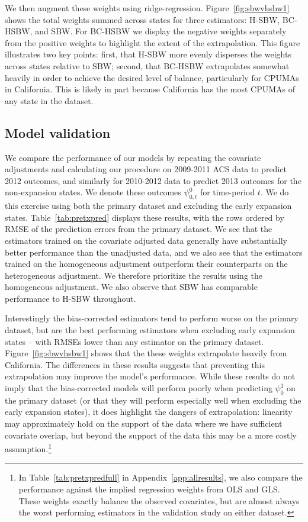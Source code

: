 \documentclass[aoas]{imsart}
\theoremstyle{plain}
\theoremstyle{remark}
\begin{document}
We then augment these weights using ridge-regression. Figure~\ref{fig:sbwvhsbw1} shows the total weights summed across states for three estimators: H-SBW, BC-HSBW, and SBW. For BC-HSBW we display the negative weights separately from the positive weights to highlight the extent of the extrapolation. This figure illustrates two key points: first, that H-SBW more evenly disperses the weights across states relative to SBW; second, that BC-HSBW extrapolates somewhat heavily in order to achieve the desired level of balance, particularly for CPUMAs in California. This is likely in part because California has the most CPUMAs of any state in the dataset.

\subsection{Model validation}\label{sec:validation}

We compare the performance of our models by repeating the covariate adjustments and calculating our procedure on 2009-2011 ACS data to predict 2012 outcomes, and similarly for 2010-2012 data to predict 2013 outcomes for the non-expansion states. We denote these outcomes $\psi^0_{0, t}$ for time-period $t$. We do this exercise using both the primary dataset and excluding the early expansion states. Table~\ref{tab:pretxpred} displays these results, with the rows ordered by RMSE of the prediction errors from the primary dataset. We see that the estimators trained on the covariate adjusted data generally have substantially better performance than the unadjusted data, and we also see that the estimators trained on the homogeneous adjustment outperform their counterparts on the heterogeneous adjustment. We therefore prioritize the results using the homogeneous adjustment. We also observe that SBW has comparable performance to H-SBW throughout.

Interestingly the bias-corrected estimators tend to perform worse on the primary dataset, but are the best performing estimators when excluding early expansion states -- with RMSEs lower than any estimator on the primary dataset. Figure~\ref{fig:sbwvhsbw1} shows that the these weights extrapolate heavily from California. The differences in these results suggests that preventing this extrapolation may improve the model's performance. While these results do not imply that the bias-corrected models will perform poorly when predicting $\psi^1_0$ on the primary dataset (or that they will perform especially well when excluding the early expansion states), it does highlight the dangers of extrapolation: linearity may approximately hold on the support of the data where we have sufficient covariate overlap, but beyond the support of the data this may be a more costly assumption.\footnote{In Table~\ref{tab:pretxpredfull} in Appendix~\ref{app:allresults}, we also compare the performance against the implied regression weights from OLS and GLS. These weights exactly balance the observed covariates, but are almost always the worst performing estimators in the validation study on either dataset.}
\end{document}

